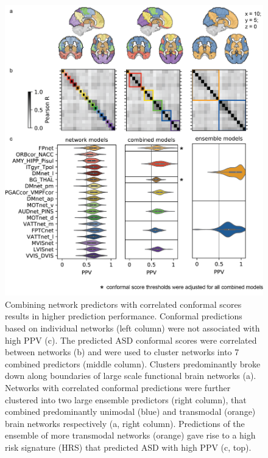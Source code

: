 \documentclass[9pt,lineno]{elife}
\begin{document}
\begin{figure}
\includegraphics[width=\linewidth]{fig1_network}
    \caption{Combining network predictors with correlated conformal scores results in higher prediction performance. Conformal predictions based on individual networks (left column) were not associated with high PPV (c). The predicted ASD conformal scores were correlated between networks (b) and were used to cluster networks into 7 combined predictors (middle column). Clusters predominantly broke down along boundaries of large scale functional brain networks (a). Networks with correlated conformal predictions were further clustered into two large ensemble predictors (right column), that combined predominantly unimodal (blue) and transmodal (orange) brain networks respectively (a, right column). Predictions of the ensemble of more transmodal networks (orange) gave rise to a high risk signature (HRS) that predicted ASD with high PPV (c, top).}
\label{fig:1_network}
\end{figure}
\end{document}
